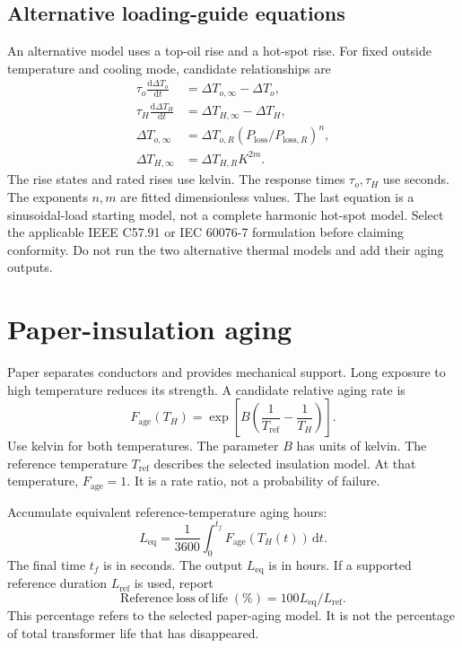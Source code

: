 \documentclass[11pt,a4paper]{report}
\newcommand{\dd}{\mathrm{d}}
\begin{document}
\subsection{Alternative loading-guide equations}
An alternative model uses a top-oil rise and a hot-spot rise.
For fixed outside temperature and cooling mode, candidate relationships are
\begin{align}
\tau_o\frac{\dd\Delta T_o}{\dd t}&=\Delta T_{o,\infty}-\Delta T_o,\\
\tau_H\frac{\dd\Delta T_H}{\dd t}&=\Delta T_{H,\infty}-\Delta T_H,\\
\Delta T_{o,\infty}&=\Delta T_{o,R}
\left(P_{\mathrm{loss}}/P_{\mathrm{loss},R}\right)^n,\\
\Delta T_{H,\infty}&=\Delta T_{H,R}K^{2m}.
\end{align}
The rise states and rated rises use kelvin.
The response times $\tau_o,\tau_H$ use seconds.
The exponents $n,m$ are fitted dimensionless values.
The last equation is a sinusoidal-load starting model, not a complete harmonic hot-spot model.
Select the applicable IEEE C57.91 or IEC 60076-7 formulation before claiming conformity.
Do not run the two alternative thermal models and add their aging outputs.

\section{Paper-insulation aging}
Paper separates conductors and provides mechanical support.
Long exposure to high temperature reduces its strength.
A candidate relative aging rate is
\begin{equation}
F_{\mathrm{age}}(T_H)=
\exp\!\left[B\left(\frac{1}{T_{\mathrm{ref}}}-\frac{1}{T_H}\right)\right].
\label{eq:paper-aging}
\end{equation}
Use kelvin for both temperatures.
The parameter $B$ has units of kelvin.
The reference temperature $T_{\mathrm{ref}}$ describes the selected insulation model.
At that temperature, $F_{\mathrm{age}}=1$.
It is a rate ratio, not a probability of failure.

Accumulate equivalent reference-temperature aging hours:
\begin{equation}
L_{\mathrm{eq}}=\frac{1}{3600}\int_0^{t_f} F_{\mathrm{age}}(T_H(t))\,\dd t.
\end{equation}
The final time $t_f$ is in seconds.
The output $L_{\mathrm{eq}}$ is in hours.
If a supported reference duration $L_{\mathrm{ref}}$ is used, report
\begin{equation}
\mathrm{Reference\ loss\ of\ life}\;(\%)=100L_{\mathrm{eq}}/L_{\mathrm{ref}}.
\end{equation}
This percentage refers to the selected paper-aging model.
It is not the percentage of total transformer life that has disappeared.
\end{document}
